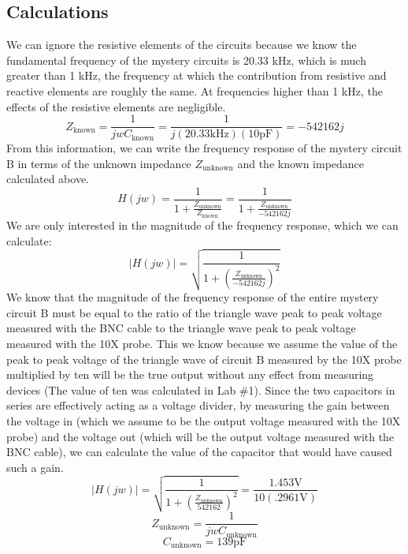 \documentclass[12pt,letterpaper]{report}
\begin{document}
\subsection*{Calculations}
We can ignore the resistive elements of the circuits because we know the fundamental frequency of the mystery circuits is 20.33 kHz, which is much greater than 1 kHz, the frequency at which the contribution from resistive and reactive elements are roughly the same. At frequencies higher than 1 kHz, the effects of the resistive elements are negligible. 
$$
Z_{\text{known}} = \frac{1}{jwC_{\text{known}}} = \frac{1}{j(20.33\text{kHz})(10\text{pF})} = -542162j
$$
From this information, we can write the frequency response of the mystery circuit B in terms of the unknown impedance $Z_{\text{unknown}}$ and the known impedance calculated above.
$$
H(jw) = \frac{1}{1+\frac{Z_{\text{unknown}}}{Z_{\text{known}}}} = \frac{1}{1+\frac{Z_{\text{unknown}}}{-542162j}}
$$
We are only interested in the magnitude of the frequency response, which we can calculate:
$$
|H(jw)| = \sqrt{\frac{1}{1+(\frac{Z_{\text{unknown}}}{-542162j})^2}}
$$
We know that the magnitude of the frequency response of the entire mystery circuit B must be equal to the ratio of the triangle wave peak to peak voltage measured with the BNC cable to the triangle wave peak to peak voltage measured with the 10X probe. This we know because we assume the value of the peak to peak voltage of the triangle wave of circuit B measured by the 10X probe multiplied by ten will be the true output without any effect from measuring devices (The value of ten was calculated in Lab \#1). Since the two capacitors in series are effectively acting as a voltage divider, by measuring the gain between the voltage in (which we assume to be the output voltage measured with the 10X probe) and the voltage out (which will be the output voltage measured with the BNC cable), we can calculate the value of the capacitor that would have caused such a gain.
$$
|H(jw)| = \sqrt{\frac{1}{1+(\frac{Z_{\text{unknown}}}{542162})^2}} = \frac{1.453 \text{V}}{10(.2961\text{V})}
$$
$$
Z_{\text{unknown}} = \frac{1}{jwC_{\text{unknown}}}
$$
$$
C_{\text{unknown}} = 139 \text{pF}
$$
\end{document}
